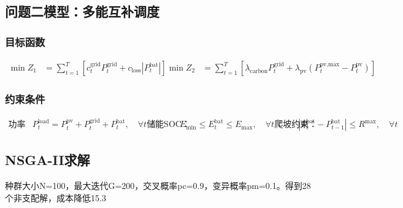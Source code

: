 \subsection{问题二模型：多能互补调度}
\subsubsection{目标函数}
\begin{align}
\min Z_1 &= \sum_{t=1}^{T}[c_t^{\text{grid}}P_t^{\text{grid}}+c_{\text{loss}}|P_t^{\text{bat}}|] 
\min Z_2 &= \sum_{t=1}^{T}[\lambda_{\text{carbon}}P_t^{\text{grid}}+\lambda_{\text{pv}}(P_t^{\text{pv,max}}-P_t^{\text{pv}})] 
\end{align}

\subsubsection{约束条件}
\begin{align}
\text{功率平衡：} & P_t^{\text{load}} = P_t^{\text{pv}}+P_t^{\text{grid}}+P_t^{\text{bat}}, \quad \forall t 
\text{储能SOC：} & E_{\min}\leq E_t^{\text{bat}}\leq E_{\max}, \quad \forall t 
\text{爬坡约束：} & |P_t^{\text{bat}}-P_{t-1}^{\text{bat}}|\leq R^{\max}, \quad \forall t 
\end{align}

\subsection{NSGA-II求解}
种群大小N=100，最大迭代G=200，交叉概率pc=0.9，变异概率pm=0.1。得到28个非支配解，成本降低15.3%